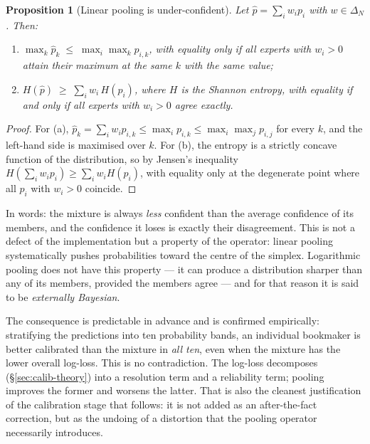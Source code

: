 \documentclass[12pt,a4paper,oneside]{report}
\renewcommand{\_}{\oldunderscore\allowbreak}
\theoremstyle{definition}
\theoremstyle{plain}
\newtheorem{proposition}[theorem]{Proposition}
\theoremstyle{remark}
\begin{document}
\begin{proposition}[Linear pooling is under-confident]
\label{prop:pooling-shrinks}
Let $\hat{p} = \sum_i w_i p_i$ with $w \in \Delta_N$. Then:
\begin{enumerate}[label=(\alph*),topsep=3pt]
  \item $\max_k \hat{p}_k \;\leq\; \max_i \max_k p_{i,k}$, with equality only if all experts
        with $w_i>0$ attain their maximum at the same $k$ with the same value;
  \item $H(\hat{p}) \;\geq\; \sum_i w_i\, H(p_i)$, where $H$ is the Shannon entropy, with
        equality if and only if all experts with $w_i>0$ agree exactly.
\end{enumerate}
\end{proposition}

\begin{proof}
For (a), $\hat{p}_k = \sum_i w_i p_{i,k} \leq \max_i p_{i,k} \leq \max_i\max_j p_{i,j}$ for
every $k$, and the left-hand side is maximised over $k$. For (b), the entropy is a strictly
concave function of the distribution, so by Jensen's inequality
$H(\sum_i w_i p_i) \geq \sum_i w_i H(p_i)$, with equality only at the degenerate point where
all $p_i$ with $w_i>0$ coincide.
\end{proof}

In words: the mixture is always \emph{less} confident than the average confidence of its
members, and the confidence it loses is exactly their disagreement. This is not a defect of the
implementation but a property of the operator: linear pooling systematically pushes
probabilities toward the centre of the simplex. Logarithmic pooling does not have this
property --- it can produce a distribution sharper than any of its members, provided the
members agree --- and for that reason it is said to be \emph{externally Bayesian}.

The consequence is predictable in advance and is confirmed empirically: stratifying the
predictions into ten probability bands, an individual bookmaker is better calibrated than the
mixture in \emph{all ten}, even when the mixture has the lower overall log-loss. This is no
contradiction. The log-loss decomposes (\S\ref{sec:calib-theory}) into a resolution term and a
reliability term; pooling improves the former and worsens the latter. That is also the cleanest
justification of the calibration stage that follows: it is not added as an after-the-fact
correction, but as the undoing of a distortion that the pooling operator necessarily
introduces.
\end{document}
